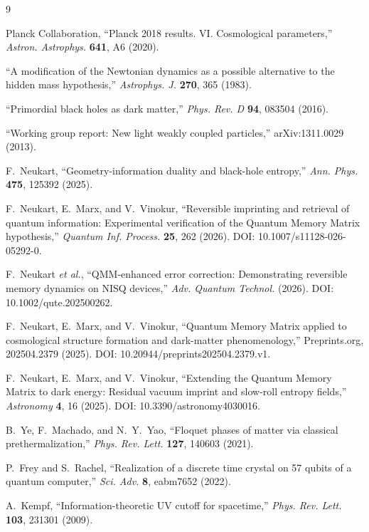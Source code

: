 \documentclass[12pt,a4paper]{article}
\begin{document}
\begin{thebibliography}{9}

Planck Collaboration,
``Planck 2018 results. VI. Cosmological parameters,''
\textit{Astron. Astrophys.} \textbf{641}, A6 (2020).

``A modification of the Newtonian dynamics as a possible alternative to the hidden mass hypothesis,''
\textit{Astrophys. J.} \textbf{270}, 365 (1983).

``Primordial black holes as dark matter,''
\textit{Phys. Rev. D} \textbf{94}, 083504 (2016).

``Working group report: New light weakly coupled particles,''
arXiv:1311.0029 (2013).

F.~Neukart,
``Geometry-information duality and black-hole entropy,''
\textit{Ann. Phys.} \textbf{475}, 125392 (2025).

F.~Neukart, E.~Marx, and V.~Vinokur,
``Reversible imprinting and retrieval of quantum information: Experimental verification of the Quantum Memory Matrix hypothesis,''
\textit{Quantum Inf. Process.} \textbf{25}, 262 (2026).
DOI: 10.1007/s11128-026-05292-0.

F.~Neukart \textit{et al.},
``QMM-enhanced error correction: Demonstrating reversible memory dynamics on NISQ devices,''
\textit{Adv. Quantum Technol.} (2026).
DOI: 10.1002/qute.202500262.

F.~Neukart, E.~Marx, and V.~Vinokur,
``Quantum Memory Matrix applied to cosmological structure formation and dark-matter phenomenology,''
Preprints.org, 202504.2379 (2025).
DOI: 10.20944/preprints202504.2379.v1.

F.~Neukart, E.~Marx, and V.~Vinokur,
``Extending the Quantum Memory Matrix to dark energy: Residual vacuum imprint and slow-roll entropy fields,''
\textit{Astronomy} \textbf{4}, 16 (2025).
DOI: 10.3390/astronomy4030016.

B.~Ye, F.~Machado, and N.~Y.~Yao,
``Floquet phases of matter via classical prethermalization,''
\textit{Phys. Rev. Lett.} \textbf{127}, 140603 (2021).

P.~Frey and S.~Rachel,
``Realization of a discrete time crystal on 57 qubits of a quantum computer,''
\textit{Sci. Adv.} \textbf{8}, eabm7652 (2022).

A.~Kempf,
``Information-theoretic UV cutoff for spacetime,''
\textit{Phys. Rev. Lett.} \textbf{103}, 231301 (2009).


\end{thebibliography}
\end{document}
